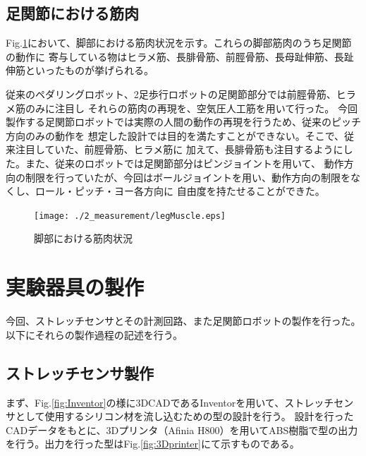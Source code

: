 \newpage

\subsection{足関節における筋肉}
Fig.\ref{fig:legMuscle}において、脚部における筋肉状況を示す。これらの脚部筋肉のうち足関節の動作に
寄与している物はヒラメ筋、長腓骨筋、前脛骨筋、長母趾伸筋、長趾伸筋といったものが挙げられる。

従来のペダリングロボット、2足歩行ロボットの足関節部分では前脛骨筋、ヒラメ筋のみに注目し
それらの筋肉の再現を、空気圧人工筋を用いて行った。
今回製作する足関節ロボットでは実際の人間の動作の再現を行うため、従来のピッチ方向のみの動作を
想定した設計では目的を満たすことができない。そこで、従来注目していた、前脛骨筋、ヒラメ筋に
加えて、長腓骨筋も注目するようにした。また、従来のロボットでは足関節部分はピンジョイントを用いて、
動作方向の制限を行っていたが、今回はボールジョイントを用い、動作方向の制限をなくし、ロール・ピッチ・ヨー各方向に
自由度を持たせることができた。
\begin{figure}[h]
    \begin{center}
     \texttt{[image: ./2\_measurement/legMuscle.eps]}
     \caption{脚部における筋肉状況}
     \label{fig:legMuscle}
    \end{center}
\end{figure}

\newpage

\section{実験器具の製作}
今回、ストレッチセンサとその計測回路、また足関節ロボットの製作を行った。以下にそれらの製作過程の記述を行う。
\subsection{ストレッチセンサ製作}
まず、Fig.\ref{fig:Inventor}の様に3DCADであるInventorを用いて、ストレッチセンサとして使用するシリコン材を流し込むための型の設計を行う。
設計を行ったCADデータをもとに、3Dプリンタ（Afinia H800）を用いてABS樹脂で型の出力を行う。出力を行った型はFig.\ref{fig:3Dprinter}にて示すものである。

